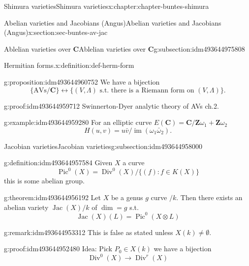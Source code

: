 \documentclass[oneside,10pt,]{book}
\numberwithin{equation}{section}
\newcommand{\ZZ}{\mathbf{Z}}
\newcommand{\CC}{\mathbf{C}}
\DeclareMathOperator{\divisors}{Div}
\DeclareMathOperator{\Pic}{Pic}
\DeclareMathOperator{\Jac}{Jac}
\DeclareMathOperator{\im}{im}
\begin{document}
\begin{chapterptx}{Shimura varieties}{}{Shimura varieties}{}{}{x:chapter:chapter-buntes-shimura}
\begin{sectionptx}{Abelian varieties and Jacobians (Angus)}{}{Abelian varieties and Jacobians (Angus)}{}{}{x:section:sec-buntes-av-jac}
\begin{subsectionptx}{Ablelian varieties over \(\CC\)}{}{Ablelian varieties over \(\CC\)}{}{}{g:subsection:idm493644975808}
\begin{definition}{Hermitian forms.}{x:definition:def-herm-form}
\end{definition}
\begin{proposition}{}{}{g:proposition:idm493644960752}%
We have a bijection%
\begin{equation*}
\{\text{AVs}/\CC\} \leftrightarrow \{(V,\Lambda)\text{ s.t. there is a Riemann form on } (V, \Lambda)\}\text{.}
\end{equation*}
%
\end{proposition}
\begin{proofptx}{}{g:proof:idm493644959712}
Swinnerton-Dyer analytic theory of AVs ch.2.%
\end{proofptx}
\begin{example}{}{g:example:idm493644959280}%
For an elliptic curve \(E(\CC) = \CC/ \ZZ \omega_1 + \ZZ \omega_2\)%
\begin{equation*}
H(u,v) = u\bar v/ \im(\omega_1 \bar \omega_2)\text{.}
\end{equation*}
%
\end{example}
\end{subsectionptx}
%
%
\typeout{************************************************}
\typeout{************************************************}
%
\begin{subsectionptx}{Jacobian varieties}{}{Jacobian varieties}{}{}{g:subsection:idm493644958000}
\begin{definition}{}{g:definition:idm493644957584}%
Given \(X\) a curve%
\begin{equation*}
\Pic^0(X) = \divisors^0(X)/\{(f) : f \in K(X)\}
\end{equation*}
this is some abelian group.%
\end{definition}
\begin{theorem}{}{}{g:theorem:idm493644956192}%
Let \(X\) be a genus \(g\) curve \(/k\). Then there exists an abelian variety \(\Jac(X)/k\) of \(\dim = g\) s.t.%
\begin{equation*}
\Jac(X)(L) = \Pic^0(X\otimes L)
\end{equation*}
%
\end{theorem}
\begin{remark}{}{g:remark:idm493644953312}%
This is false as stated unless \(X(k) \ne \emptyset\).%
\end{remark}
\begin{proofptx}{}{g:proof:idm493644952480}
Idea: Pick \(P_0 \in X(k)\) we have a bijection%
\begin{equation*}
\divisors^0(X) \to \divisors^r(X)
\end{equation*}

\end{proofptx}
\end{subsectionptx}
\end{sectionptx}
\end{chapterptx}
\end{document}
